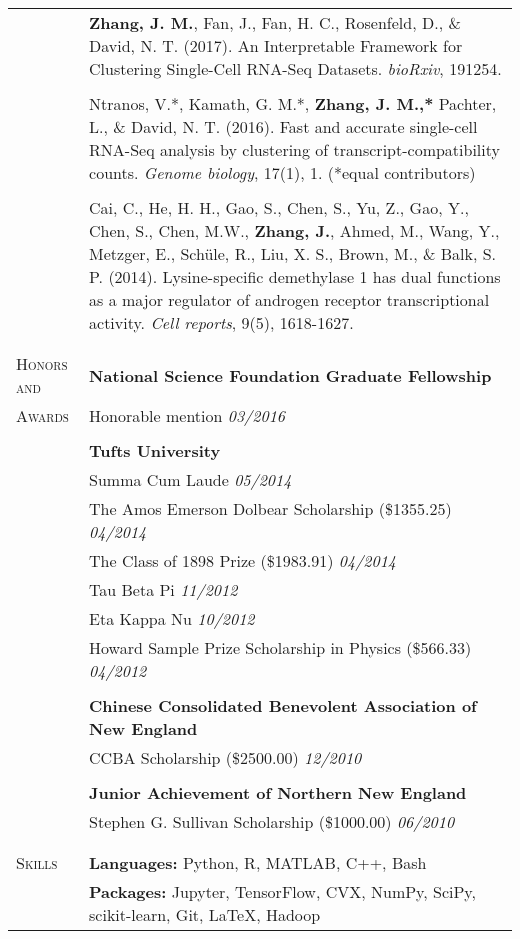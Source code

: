 \documentclass[letterpaper,11pt,oneside]{article}
\begin{document}
\begin{longtable}{@{} p{2.5cm} p{14.8cm}}
 	& \textbf{Zhang, J. M.}, Fan, J., Fan, H. C., Rosenfeld, D., \&  David, N. T. (2017). An Interpretable Framework for Clustering Single-Cell RNA-Seq Datasets. \textit{bioRxiv}, 191254. \\
     & \\

	& Ntranos, V.*, Kamath, G. M.*, \textbf{Zhang, J. M.,*} Pachter, L., \& David, N. T. (2016). Fast and accurate single-cell RNA-Seq analysis by clustering of transcript-compatibility counts. \textit{Genome biology}, 17(1), 1. (*equal contributors) \\
     & \\
     
     & Cai, C., He, H. H., Gao, S., Chen, S., Yu, Z., Gao, Y., Chen, S., Chen, M.W., \textbf{Zhang, J.}, Ahmed, M., Wang, Y., Metzger, E., Sch\"{u}le, R., Liu, X. S., Brown, M., \& Balk, S. P. (2014). Lysine-specific demethylase 1 has dual functions as a major regulator of androgen receptor transcriptional activity. \textit{Cell reports}, 9(5), 1618-1627. \\
     & \\ 
     & \\
    

 \large{\textsc{Honors and}}  & \textbf{National Science Foundation Graduate Fellowship}   \\*
 \large{\textsc{Awards}} & Honorable mention \hfill \textit{03/2016} \\*
& \\*
& \textbf{Tufts University} \\
& Summa Cum Laude \hfill \textit{05/2014} \\
& The Amos Emerson Dolbear Scholarship (\$1355.25) \hfill \textit{04/2014} \\
& The Class of 1898 Prize (\$1983.91) \hfill \textit{04/2014} \\
& Tau Beta Pi \hfill \textit{11/2012} \\
& Eta Kappa Nu \hfill \textit{10/2012} \\
& Howard Sample Prize Scholarship in Physics (\$566.33) \hfill \textit{04/2012} \\
& \\
& \textbf{Chinese Consolidated Benevolent Association of New England} \\
& CCBA Scholarship (\$2500.00) \hfill \textit{12/2010} \\
& \\
& \textbf{Junior Achievement of Northern New England} \\
& Stephen G. Sullivan Scholarship (\$1000.00) \hfill \textit{06/2010} \\
& \\
& \\
     
  \large{\textsc{Skills}}   & \textbf{Languages:} Python, R, MATLAB, C++, Bash \\
   & \textbf{Packages:} Jupyter, TensorFlow, CVX, NumPy, SciPy, scikit-learn, Git, \LaTeX, Hadoop \\
\end{longtable}
\end{document}
